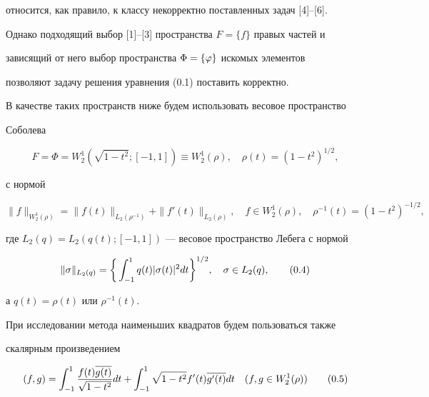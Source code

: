 относится, как правило, к классу некорректно поставленных задач [4]--[6]. 


Однако подходящий выбор [1]--[3] пространства $F=\{f\}$ правых частей и 


зависящий от него выбор пространства $\Phi =\{\varphi\}$ искомых элементов 


позволяют задачу решения уравнения (0.1) поставить корректно. 





В качестве таких пространств ниже будем использовать весовое пространство 


Соболева 


\begin{equation}


F = \Phi = W_2^1(\sqrt{1-t^2};[-1,1]) \equiv W_2^1(\rho),


\quad \rho(t) = (1-t^2)^{1/2},


\tag{0.2}


\end{equation}


с нормой


\begin{equation}


\|f\|_{W_2^1(\rho)}=\|f(t)\|_{L_2(\rho^{-1})}+\|f'(t)\|_{L_2(\rho)},


\quad f\in W_2^1(\rho),\quad \rho^{-1}(t) = (1-t^2)^{-1/2},


\tag{0.3}


\end{equation}


где $L_2(q)=L_2(q(t);[-1,1])$ --- весовое пространство Лебега с нормой


\begin{equation}


\|\si\|_{L_2(q)} = \bigg\{


\int_{-1}^{1}q(t)|\si(t)|^2 dt


\bigg\}^{1/2},\quad \si \in L_2(q),


\tag{0.4}


\end{equation}


а $q(t)=\rho(t)$ или $\rho^{-1}(t)$.


При исследовании метода наименьших квадратов будем пользоваться также 


скалярным произведением


\begin{equation}


(f,g) = \int_{-1}^{1}\frac{f(t)\ol{g(t)}}{\sqrt{1-t^2}}dt +


\int_{-1}^{1}\sqrt{1-t^2}f'(t)\ol{g'(t)}dt\quad


(f,g\in W_2^1(\rho))


\tag{0.5}


\end{equation}


